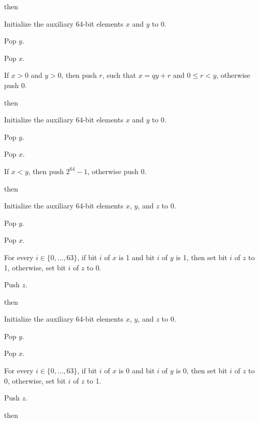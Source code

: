\documentclass[a4paper,12pt]{article}
\newcommand{\num}[1]{\texttt{#1}\xspace}
\newcommand{\hex}[1]{\num{#1}$_{\textup{\tiny\hskip-1ex 16}}$\xspace}
\newcommand{\range}[2]{\{#1,\ldots,#2\}}
\newcommand{\op}[1]{#1}
\newcommand{\REM}       [1]{\op{\hex{23}}}
\newcommand{\LT}        [1]{\op{\hex{24}}}
\newcommand{\AND}       [1]{\op{\hex{28}}}
\newcommand{\OR}        [1]{\op{\hex{29}}}
\newcommand{\NOT}       [1]{\op{\hex{2A}}}
\begin{document}
\begin{stepnumbers}[start=3]
\begin{description}
\begin{stepnumbers}
    \end{stepnumbers}
  \item[\REM{}] then
    \begin{stepnumbers}
    \item Initialize the auxiliary 64-bit elements $x$ and $y$ to 0.
    \item Pop $y$.
    \item Pop $x$.
    \item If $x > 0$ and $y > 0$, then push $r$, such that $x = qy + r$ and $0 \leq r < y$, otherwise push 0.
    \end{stepnumbers}
  \item[\LT{}] then
    \begin{stepnumbers}
    \item Initialize the auxiliary 64-bit elements $x$ and $y$ to 0.
    \item Pop $y$.
    \item Pop $x$.
    \item If $x < y$, then push $2^{64} - 1$, otherwise push 0.
    \end{stepnumbers}
  \item[\AND{}] then
    \begin{stepnumbers}
    \item Initialize the auxiliary 64-bit elements $x$, $y$, and $z$ to 0.
    \item Pop $y$.
    \item Pop $x$.
    \item For every $i \in \range{0}{63}$, if bit $i$ of $x$ is 1 and bit $i$ of $y$ is 1, then set bit $i$ of $z$ to 1, otherwise, set bit $i$ of $z$ to 0.
    \item Push $z$.
    \end{stepnumbers}
  \item[\OR{}] then
    \begin{stepnumbers}
    \item Initialize the auxiliary 64-bit elements $x$, $y$, and $z$ to 0.
    \item Pop $y$.
    \item Pop $x$.
    \item For every $i \in \range{0}{63}$, if bit $i$ of $x$ is 0 and bit $i$ of $y$ is 0, then set bit $i$ of $z$ to 0, otherwise, set bit $i$ of $z$ to 1. %
    \item Push $z$.
    \end{stepnumbers}
  \item[\NOT{}] then
    \begin{stepnumbers}

\end{stepnumbers}
\end{description}
\end{stepnumbers}
\end{document}

